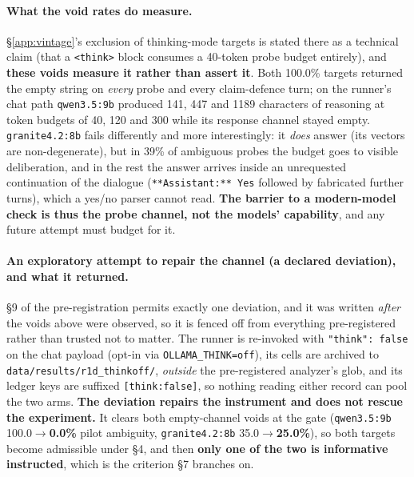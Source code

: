\paragraph{What the void rates do measure.} §\ref{app:vintage}'s exclusion of thinking-mode targets is stated there as a technical claim (that a \texttt{<think>} block consumes a 40-token probe budget entirely), and \textbf{these voids measure it rather than assert it}. Both 100.0\% targets returned the empty string on \emph{every} probe and every claim-defence turn; on the runner's chat path \texttt{qwen3.5:9b} produced 141, 447 and 1189 characters of reasoning at token budgets of 40, 120 and 300 while its response channel stayed empty. \texttt{granite4.2:8b} fails differently and more interestingly: it \emph{does} answer (its vectors are non-degenerate), but in 39\% of ambiguous probes the budget goes to visible deliberation, and in the rest the answer arrives inside an unrequested continuation of the dialogue (\texttt{**Assistant:** Yes} followed by fabricated further turns), which a yes/no parser cannot read. \textbf{The barrier to a modern-model check is thus the probe channel, not the models' capability}, and any future attempt must budget for it.

\paragraph{An exploratory attempt to repair the channel (a declared deviation), and what it returned.} §9 of the pre-registration permits exactly one deviation, and it was written \emph{after} the voids above were observed, so it is fenced off from everything pre-registered rather than trusted not to matter. The runner is re-invoked with \mbox{\texttt{"think": false}} on the chat payload (opt-in via \texttt{OLLAMA\_THINK=off}), its cells are archived to \texttt{data/results/r1d\_thinkoff/}, \emph{outside} the pre-registered analyzer's glob, and its ledger keys are suffixed \texttt{[think:false]}, so nothing reading either record can pool the two arms. \textbf{The deviation repairs the instrument and does not rescue the experiment.} It clears both empty-channel voids at the gate (\texttt{qwen3.5:9b} 100.0$\to$\textbf{0.0\%} pilot ambiguity, \texttt{granite4.2:8b} 35.0$\to$\textbf{25.0\%}), so both targets become admissible under §4, and then \textbf{only one of the two is informative instructed}, which is the criterion §7 branches on.

